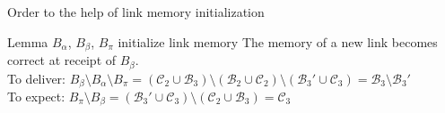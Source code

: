 \documentclass[10pt, xcolor={usenames, dvipsnames}]{beamer}
\begin{document}
\begin{frame}{Order to the help of link memory initialization}
  \begin{block}{Lemma $B_\alpha$, $B_\beta$, $B_\pi$ initialize link memory}
    The memory of a new link becomes correct at receipt of $B_\beta$. \\
    To deliver:
    $B_\beta \setminus B_\alpha \setminus B_\pi = (\mathcal{C}_2 \cup
    \mathcal{B}_3) \setminus (\mathcal{B}_2 \cup \mathcal{C}_2) \setminus
    (\mathcal{B}_3' \cup \mathcal{C}_3) = \mathcal{B}_3 \setminus
    \mathcal{B}_3'$\\
    To expect:
    $B_\pi \setminus B_\beta = (\mathcal{B}_3' \cup \mathcal{C}_3) \setminus
    (\mathcal{C}_2 \cup \mathcal{B}_3) = \mathcal{C}_3$

  \end{block}   
    
\end{frame}


  

%     
%     
%     

%     
%     
%     
\end{document}
